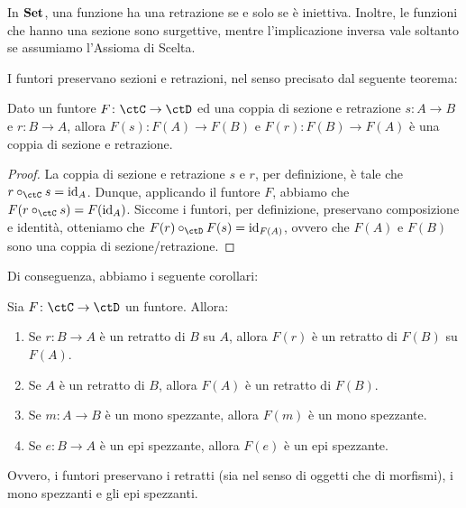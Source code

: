 \begin{example}
	\label{exm:set-sezioni-retrazioni}
	In \(\mathbf{Set}\), una funzione ha una retrazione se e solo se è iniettiva.
	Inoltre, le funzioni che hanno una sezione sono surgettive,
	mentre l'implicazione inversa vale soltanto se assumiamo l'Assioma di Scelta.
\end{example}

I funtori preservano sezioni e retrazioni,
nel senso precisato dal seguente teorema:

\begin{theorem}%
	\label{thm:fun-sezioni-retrazioni}
	Dato un funtore \(F \colon \ctC \to \ctD\) ed una coppia di sezione e retrazione \(s \colon A \to B\) e \(r \colon B \to A\),
	allora \(F(s) \colon F(A) \to F(B)\) e \(F(r) \colon F(B) \to F(A)\) è una coppia di sezione e retrazione.
\end{theorem}
\begin{proof}
	La coppia di sezione e retrazione \(s\) e \(r\),
	per definizione, è tale che \(r \cmp_{\ctC} s = \id_A\).
	Dunque, applicando il funtore \(F\), abbiamo che \(F(r \cmp_{\ctC} s) = F(\id_A)\).
	Siccome i funtori, per definizione, preservano composizione e identità,
	otteniamo che \(F(r) \cmp_{\ctD} F(s) = \id_{F(A)}\),
	ovvero che \(F(A)\) e \(F(B)\) sono una coppia di sezione/retrazione.
\end{proof}

Di conseguenza, abbiamo i seguente corollari:

\begin{corollary}%
	\label{cor:fun-sezioni-retrazioni}
	Sia \(F \colon \ctC \to \ctD\) un funtore.
	Allora:
	\begin{enumerate}
		\item Se \(r \colon B \to A\) è un retratto di \(B\) su \(A\),
		      allora \(F(r)\) è un retratto di \(F(B)\) su \(F(A)\).
		\item Se \(A\) è un retratto di \(B\),
		      allora \(F(A)\) è un retratto di \(F(B)\).
		\item Se \(m \colon A \to B\) è un mono spezzante,
		      allora \(F(m)\) è un mono spezzante.
		\item Se \(e \colon B \to A\) è un epi spezzante,
		      allora \(F(e)\) è un epi spezzante.
	\end{enumerate}
	Ovvero, i funtori preservano i retratti (sia nel senso di oggetti che di morfismi),
	i mono spezzanti e gli epi spezzanti.
\end{corollary}

